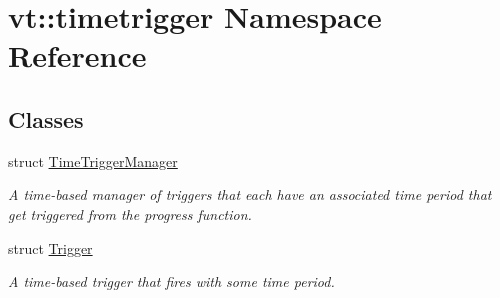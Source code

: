 \hypertarget{namespacevt_1_1timetrigger}{}\section{vt\+:\+:timetrigger Namespace Reference}
\label{namespacevt_1_1timetrigger}
\subsection*{Classes}
\begin{DoxyCompactItemize}
\item 
struct \hyperlink{structvt_1_1timetrigger_1_1_time_trigger_manager}{Time\+Trigger\+Manager}
\begin{DoxyCompactList}\small\item\em A time-\/based manager of triggers that each have an associated time period that get triggered from the progress function. \end{DoxyCompactList}\item 
struct \hyperlink{structvt_1_1timetrigger_1_1_trigger}{Trigger}
\begin{DoxyCompactList}\small\item\em A time-\/based trigger that fires with some time period. \end{DoxyCompactList}\end{DoxyCompactItemize}
